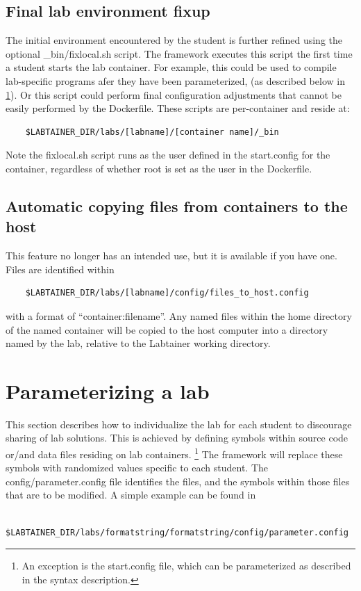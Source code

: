 \documentclass[12pt]{article}
\begin{document}
\subsection{Final lab environment fixup}
The initial environment encountered by the student is further refined using
the optional \_bin/fixlocal.sh script.  The framework executes
this script the first time a student starts the lab container.  For example,
this could be used to compile lab-specific programs afer they have been parameterized,
(as described below in \ref{parameterize}).  Or this script could perform final configuration adjustments
that cannot be easily performed by the Dockerfile.  These scripts are per-container
and reside at:
\begin{verbatim}
    $LABTAINER_DIR/labs/[labname]/[container name]/_bin
\end{verbatim}
\noindent Note the fixlocal.sh script runs as the user defined in the start.config for the container, 
regardless of whether root is set as the user in the Dockerfile.

\subsection{Automatic copying files from containers to the host}
This feature no longer has an intended use, but it is available if you have one.
Files are identified within
\begin{verbatim}
    $LABTAINER_DIR/labs/[labname]/config/files_to_host.config
\end{verbatim}
\noindent with a format of ``container:filename''.  Any named files within the home directory of
the named container will be copied to the host computer into a directory named by the lab, relative
to the Labtainer working directory.

\section{Parameterizing a lab}
\label{parameterize}
This section describes how to individualize the lab for each student to discourage
sharing of lab solutions.  This is achieved by defining symbols within source 
code or/and data files residing on lab containers. \footnote{An exception is the
start.config file, which can be parameterized as described in the syntax description.}  
The framework will replace these symbols with randomized values
specific to each student.  The config/parameter.config file identifies the files, and
the symbols within those files that are to be modified.  A simple example can be found in 
\begin{verbatim}
    $LABTAINER_DIR/labs/formatstring/formatstring/config/parameter.config
\end{verbatim}
\end{document}
